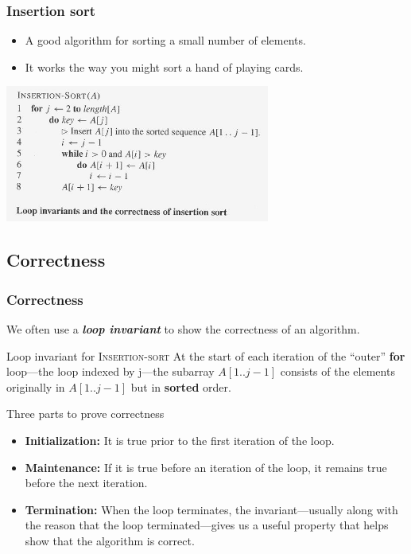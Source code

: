 \documentclass[notes,serif]{beamer}
\begin{document}
\begin{frame}
  \frametitle{Insertion sort}
  \begin{itemize}
    \item A good algorithm for sorting a {\color{red}small} number of elements.
    \item It works the way you might sort a hand of playing cards.
  \end{itemize}
  \begin{block}{}
      \includegraphics[height=4.5cm]{insertion_sort_a}
  \end{block}
\end{frame}

\subsection{Correctness}
\begin{frame}
  \frametitle{Correctness}
  We often use a {\bf \em loop invariant} to show the correctness of an algorithm.
  \begin{exampleblock}{Loop invariant for I\textsc{nsertion-\textnormal{s}ort}}
    At the start of each iteration of the ``outer'' {\bf for} loop---the
loop indexed by j---the subarray $A[1 . . j-1]$ consists of the elements originally
in $A[1 . . j-1]$ but in {\bf sorted} order.
  \end{exampleblock}
  \begin{block}{Three parts to prove correctness}
  \begin{itemize}
    \item {\bf Initialization:} It is true prior to the first iteration of the loop.
    \item {\bf Maintenance:}  If it is true before an iteration of the loop, it remains true before the
next iteration.
    \item {\bf Termination:} When the loop terminates, the invariant---usually along with the
reason that the loop terminated---gives us a useful property that helps show that the algorithm is correct.
  \end{itemize}
  \end{block}
\end{frame}
\end{document}
